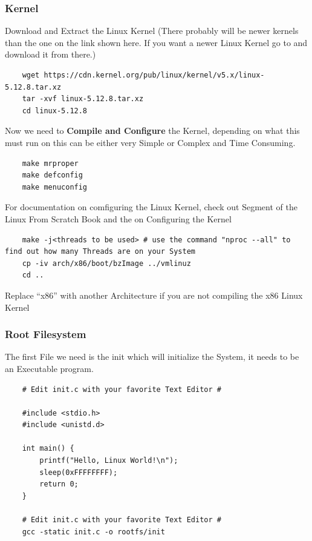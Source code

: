 \documentclass{article}
\begin{document}
		\subsubsection{Kernel}

			Download and Extract the Linux Kernel (There probably will be newer kernels than the one on the link shown here. If you want a newer Linux Kernel go to  and download it from there.)
			\begin{lstlisting}
	wget https://cdn.kernel.org/pub/linux/kernel/v5.x/linux-5.12.8.tar.xz
	tar -xvf linux-5.12.8.tar.xz
	cd linux-5.12.8
			\end{lstlisting}
			Now we need to \textbf{Compile and Configure} the Kernel, depending on what this must run on this can be either very Simple or Complex and Time Consuming.
			\begin{lstlisting}
	make mrproper
	make defconfig
	make menuconfig
			\end{lstlisting}
			For documentation on comfiguring the Linux Kernel, check out  Segment of the Linux From Scratch Book and the  on Configuring the Kernel
			\begin{lstlisting}
	make -j<threads to be used> # use the command "nproc --all" to find out how many Threads are on your System
	cp -iv arch/x86/boot/bzImage ../vmlinuz
	cd ..
			\end{lstlisting}
			Replace ``x86'' with another Architecture if you are not compiling the x86 Linux Kernel
		\subsubsection{Root Filesystem}
			The first File we need is the init which will initialize the System, it needs to be an Executable program.
			\begin{lstlisting}
	# Edit init.c with your favorite Text Editor #
	
	#include <stdio.h>
	#include <unistd.d>

	int main() {
		printf("Hello, Linux World!\n");
		sleep(0xFFFFFFFF);
		return 0;
	}

	# Edit init.c with your favorite Text Editor #
	gcc -static init.c -o rootfs/init
			\end{lstlisting}
\end{document}
